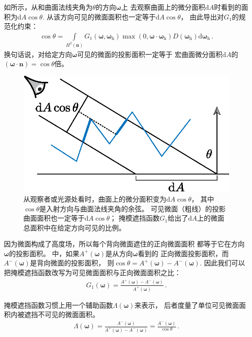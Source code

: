 如所示，从和曲面法线夹角为$\theta$的方向$\bm\omega$上
去观察曲面上的微分面积$\mathrm{d}A$时看到的面积为$\mathrm{d}A\cos\theta$.
从该方向可见的微面面积也一定等于$\mathrm{d}A\cos\theta$，
由此导出对$G_1$的规范化约束：
\begin{align}
    \label{eq:8.12}
    \cos\theta=\int\limits_{H^2({\bm n})}G_1({\bm\omega},{\bm\omega}_{\mathrm{h}})\max(0,{\bm\omega}\cdot{\bm\omega}_{\mathrm{h}})D({\bm\omega}_{\mathrm{h}})\mathrm{d}{\bm\omega}_{\mathrm{h}}\, .
\end{align}
换句话说，对给定方向$\bm\omega$可见的微面的投影面积一定等于
宏曲面微分面积$\mathrm{d}A$的$({\bm\omega}\cdot{\bm n})=\cos\theta$倍。

\begin{figure}[htbp]
    \centering
    \includegraphics[width=0.5\linewidth]{Pictures/chap08/Microfacetvisiblearea.eps}
    \caption{从观察者或光源处看时，曲面上的微分面积变为$\mathrm{d}A\cos\theta$，
        其中$\cos\theta$是入射方向与曲面法线夹角的余弦。
        可见微面（粗线）的投影曲面面积也一定等于$\mathrm{d}A\cos\theta$；
        掩模遮挡函数$G_1$给出了$\mathrm{d}A$上的微面总面积中在给定方向可见的比例。}
    \label{fig:8.17}
\end{figure}

因为微面构成了高度场，所以每个背向微面遮住的正向微面面积
都等于它在方向$\bm\omega$的投影面积。
中，如果$A^{+}({\bm\omega})$是从方向$\bm\omega$看到的
正向微面投影面积，而$A^{-}({\bm\omega})$是背向微面的投影面积，
则$\cos\theta=A^{+}({\bm\omega})-A^{-}({\bm\omega})$.
因此我们可以把掩模遮挡函数改写为可见微面面积与正向微面面积之比：
\begin{align*}
    G_1({\bm\omega})=\frac{A^{+}({\bm\omega})-A^{-}({\bm\omega})}{A^{+}({\bm\omega})}\, .
\end{align*}

掩模遮挡函数习惯上用一个辅助函数$\Lambda({\bm\omega})$来表示，
后者度量了单位可见微面面积内被遮挡不可见的微面面积。
\begin{align}
    \label{eq:8.13}
    \Lambda({\bm\omega})=\frac{A^{-}({\bm\omega})}{A^{+}({\bm\omega})-A^{-}({\bm\omega})}=\frac{A^{-}({\bm\omega})}{\cos\theta}\, .
\end{align}


